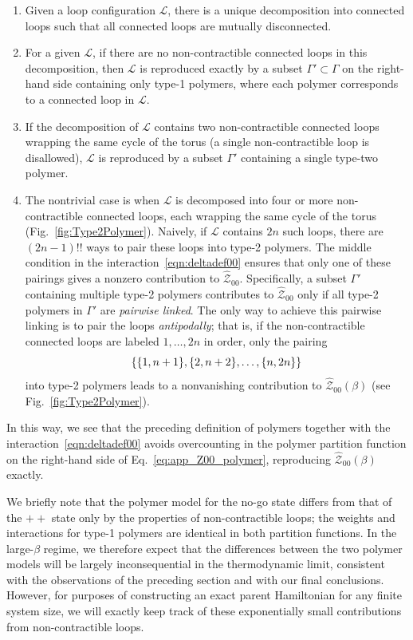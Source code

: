 \begin{enumerate}
    \item Given a loop configuration $\mathcal{L}$, there is a unique decomposition into connected loops such that all connected loops are mutually disconnected.
    \item For a given $\mathcal{L}$, if there are no non-contractible connected loops in this decomposition, then $\mathcal{L}$ is reproduced exactly by a subset $\Gamma' \subset \Gamma$ on the right-hand side containing only type-1 polymers, where each polymer corresponds to a connected loop in $\mathcal{L}$. 
    \item If the decomposition of $\mathcal{L}$ contains two non-contractible connected loops wrapping the same cycle of the torus (a single non-contractible loop is disallowed), $\mathcal{L}$ is reproduced by a subset $\Gamma'$ containing a single type-two polymer.
    \item The nontrivial case is when $\mathcal{L}$ is decomposed into four or more non-contractible connected loops, each wrapping the same cycle of the torus (Fig.~\ref{fig:Type2Polymer}). Naively, if $\mathcal{L}$ contains $2n$ such loops, there are $(2n-1)!!$ ways to pair these loops into type-2 polymers. The middle condition in the interaction~\eqref{eqn:deltadef00} ensures that only one of these pairings gives a nonzero contribution to $\hat{\mathcal{Z}}_{00}$. Specifically, a subset $\Gamma'$ containing multiple type-2 polymers contributes to $\hat{\mathcal{Z}}_{00}$ only if all type-2 polymers in $\Gamma'$ are \emph{pairwise linked}. The only way to achieve this pairwise linking is to pair the loops \emph{antipodally}; that is, if the non-contractible connected loops are labeled $1, \ldots , 2n$ in order, only the pairing
    \begin{equation}
        \qty{ \qty{1, n+1}, \qty{2, n+2}, \ldots , \qty{n, 2n} }
    \end{equation}
    into type-2 polymers leads to a nonvanishing contribution to $\hat{\mathcal{Z}}_{00}(\beta)$ (see Fig.~\ref{fig:Type2Polymer}).
\end{enumerate}
In this way, we see that the preceding definition of polymers together with the interaction~\eqref{eqn:deltadef00} avoids overcounting in the polymer partition function on the right-hand side of Eq.~\eqref{eq:app_Z00_polymer}, reproducing $\hat{\mathcal{Z}}_{00}(\beta)$ exactly.



We briefly note that the polymer model for the no-go state differs from that of the $++$ state only by the properties of non-contractible loops; the weights and interactions for type-1 polymers are identical in both partition functions. In the large-$\beta$ regime, we therefore expect that the differences between the two polymer models will be largely inconsequential in the thermodynamic limit, consistent with the observations of the preceding section and with our final conclusions. However, for purposes of constructing an exact parent Hamiltonian for any finite system size, we will exactly keep track of these exponentially small contributions from non-contractible loops.

